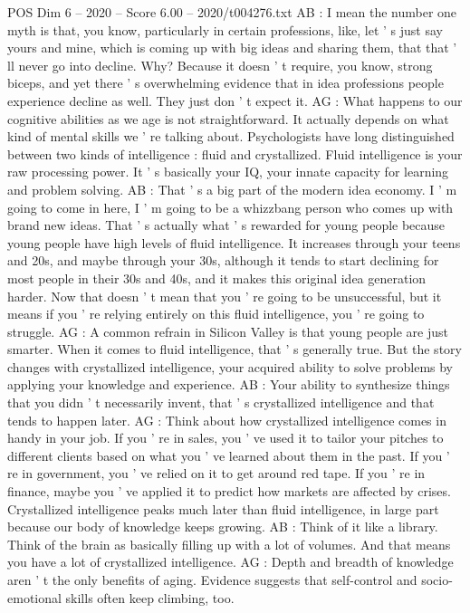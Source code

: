 \begin{textsample}{POS Dim 6 – 2020 – Score 6.00 – 2020/t004276.txt}
AB : I mean the number one myth is that, you know, particularly in certain professions, like, let ' s just say yours and mine, which is coming up with big ideas and sharing them, that that ' ll never go into decline.
Why?
Because it doesn ' t require, you know, strong biceps, and yet there ' s overwhelming evidence that in idea professions people experience decline as well.
They just don ' t expect it.
AG : What happens to our cognitive abilities as we age is not straightforward.
It actually depends on what kind of mental skills we ' re talking about.
Psychologists have long distinguished between two kinds of intelligence : fluid and crystallized.
Fluid intelligence is your raw processing power.
It ' s basically your IQ, your innate capacity for learning and problem solving.
AB : That ' s a big part of the modern idea economy.
I ' m going to come in here, I ' m going to be a whizzbang person who comes up with brand new ideas.
That ' s actually what ' s rewarded for young people because young people have high levels of fluid intelligence.
It increases through your teens and 20s, and maybe through your 30s, although it tends to start declining for most people in their 30s and 40s, and it makes this original idea generation harder.
Now that doesn ' t mean that you ' re going to be unsuccessful, but it means if you ' re relying entirely on this fluid intelligence, you ' re going to struggle.
AG : A common refrain in Silicon Valley is that young people are just smarter.
When it comes to fluid intelligence, that ' s generally true.
But the story changes with crystallized intelligence, your acquired ability to solve problems by applying your knowledge and experience.
AB : Your ability to synthesize things that you didn ' t necessarily invent, that ' s crystallized intelligence and that tends to happen later.
AG : Think about how crystallized intelligence comes in handy in your job.
If you ' re in sales, you ' ve used it to tailor your pitches to different clients based on what you ' ve learned about them in the past.
If you ' re in government, you ' ve relied on it to get around red tape.
If you ' re in finance, maybe you ' ve applied it to predict how markets are affected by crises.
Crystallized intelligence peaks much later than fluid intelligence, in large part because our body of knowledge keeps growing.
AB : Think of it like a library.
Think of the brain as basically filling up with a lot of volumes.
And that means you have a lot of crystallized intelligence.
AG : Depth and breadth of knowledge aren ' t the only benefits of aging.
Evidence suggests that self-control and socio-emotional skills often keep climbing, too.

\end{textsample}
